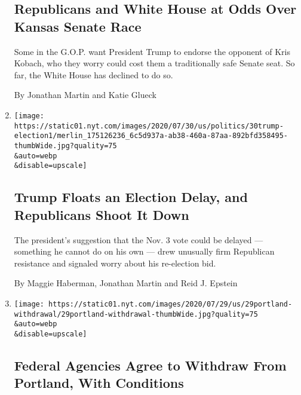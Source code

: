 \begin{enumerate}
  \hypertarget{republicans-and-white-house-at-odds-over-kansas-senate-race}{%
  \subsection{Republicans and White House at Odds Over Kansas Senate
  Race}\label{republicans-and-white-house-at-odds-over-kansas-senate-race}}

  Some in the G.O.P. want President Trump to endorse the opponent of
  Kris Kobach, who they worry could cost them a traditionally safe
  Senate seat. So far, the White House has declined to do so.

  By Jonathan Martin and Katie Glueck
\item
  \href{/2020/07/30/us/politics/trump-delay-2020-election.html}{}

  \texttt{[image: https://static01.nyt.com/images/2020/07/30/us/politics/30trump-election1/merlin\_175126236\_6c5d937a-ab38-460a-87aa-892bfd358495-thumbWide.jpg?quality=75\\\&auto=webp\\\&disable=upscale]}

  \hypertarget{trump-floats-an-election-delay-and-republicans-shoot-it-down}{%
  \subsection{Trump Floats an Election Delay, and Republicans Shoot It
  Down}\label{trump-floats-an-election-delay-and-republicans-shoot-it-down}}

  The president's suggestion that the Nov. 3 vote could be delayed ---
  something he cannot do on his own --- drew unusually firm Republican
  resistance and signaled worry about his re-election bid.

  By Maggie Haberman, Jonathan Martin and Reid J. Epstein
\item
  \href{/2020/07/29/us/protests-portland-federal-withdrawal.html}{}

  \texttt{[image: https://static01.nyt.com/images/2020/07/29/us/29portland-withdrawal/29portland-withdrawal-thumbWide.jpg?quality=75\\\&auto=webp\\\&disable=upscale]}

  \hypertarget{federal-agencies-agree-to-withdraw-from-portland-with-conditions}{%
  \subsection{Federal Agencies Agree to Withdraw From Portland, With
  Conditions}\label{federal-agencies-agree-to-withdraw-from-portland-with-conditions}}


\end{enumerate}
